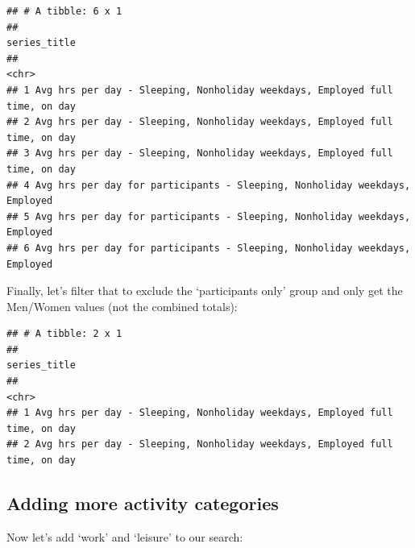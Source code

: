 \documentclass[]{book}
\newenvironment{Shaded}{\begin{snugshade}}{\end{snugshade}}
\newcommand{\KeywordTok}[1]{\textcolor[rgb]{0.13,0.29,0.53}{\textbf{{#1}}}}
\newcommand{\DataTypeTok}[1]{\textcolor[rgb]{0.13,0.29,0.53}{{#1}}}
\newcommand{\StringTok}[1]{\textcolor[rgb]{0.31,0.60,0.02}{{#1}}}
\newcommand{\OtherTok}[1]{\textcolor[rgb]{0.56,0.35,0.01}{{#1}}}
\newcommand{\NormalTok}[1]{{#1}}
\theoremstyle{definition}
\theoremstyle{definition}
\theoremstyle{remark}
\begin{document}
\begin{verbatim}
## # A tibble: 6 x 1
##                                                                  series_title
##                                                                         <chr>
## 1 Avg hrs per day - Sleeping, Nonholiday weekdays, Employed full time, on day
## 2 Avg hrs per day - Sleeping, Nonholiday weekdays, Employed full time, on day
## 3 Avg hrs per day - Sleeping, Nonholiday weekdays, Employed full time, on day
## 4 Avg hrs per day for participants - Sleeping, Nonholiday weekdays, Employed 
## 5 Avg hrs per day for participants - Sleeping, Nonholiday weekdays, Employed 
## 6 Avg hrs per day for participants - Sleeping, Nonholiday weekdays, Employed
\end{verbatim}

Finally, let's filter that to exclude the `participants only' group and
only get the Men/Women values (not the combined totals):

\begin{Shaded}
\end{Shaded}

\begin{verbatim}
## # A tibble: 2 x 1
##                                                                  series_title
##                                                                         <chr>
## 1 Avg hrs per day - Sleeping, Nonholiday weekdays, Employed full time, on day
## 2 Avg hrs per day - Sleeping, Nonholiday weekdays, Employed full time, on day
\end{verbatim}

\subsection{Adding more activity
categories}\label{adding-more-activity-categories}

Now let's add `work' and `leisure' to our search:

\begin{Shaded}
\end{Shaded}
\end{document}
